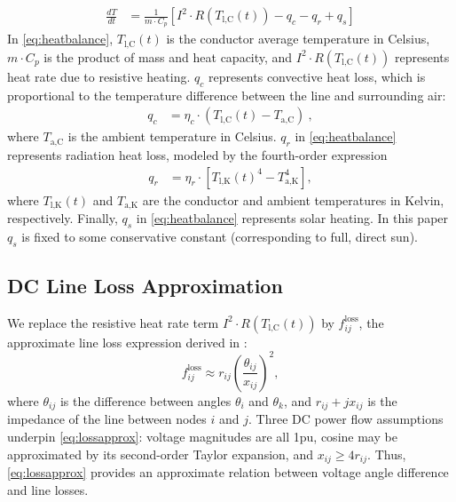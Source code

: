 \documentclass[journal,twoside]{IEEEtran}
\begin{document}
\begin{align}\label{eq:heatbalance}
\frac{dT}{dt} &= \frac{1}{m\cdot C_p}\left[I^2\cdot R(T_\text{l,C}(t)) - q_c - q_r + q_s \right]
\end{align}
In \eqref{eq:heatbalance}, $T_\text{l,C}(t)$ is the conductor average temperature in Celsius, $m\cdot C_p$ is the product of mass and heat capacity, and $I^2\cdot R(T_\text{l,C}(t))$ represents heat rate due to resistive heating. $q_c$ represents convective heat loss, which is proportional to the temperature difference between the line and surrounding air:
\begin{align}\label{eq:qc}
q_c &= \eta_c\cdot(T_\text{l,C}(t) - T_\text{a,C})~,
\end{align}
where $T_\text{a,C}$ is the ambient temperature in Celsius. $q_r$ in \eqref{eq:heatbalance} represents radiation heat loss, modeled by the fourth-order expression
\begin{align}\label{eq:qr}
 q_r &= \eta_r\cdot\left[T_\text{l,K}(t)^4 - T_\text{a,K}^4\right],
\end{align}
where $T_\text{l,K}(t)$ and $T_\text{a,K}$ are the conductor and ambient temperatures in Kelvin, respectively. Finally, $q_s$ in \eqref{eq:heatbalance} represents solar heating. In this paper $q_s$ is fixed to some conservative constant (corresponding to full, direct sun).

\subsection{DC Line Loss Approximation}
We replace the resistive heat rate term $I^2\cdot R(T_\text{l,C}(t))$ by $f_{ij}^\text{loss}$, the approximate line loss expression derived in \cite{almassalkhi2014}:
\begin{equation}\label{eq:lossapprox}
f_{ij}^{\text{loss}} \approx r_{ij}\left(\frac{\theta_{ij}}{x_{ij}}\right)^2,
\end{equation}
where $\theta_{ij}$ is the difference between angles $\theta_i$ and $\theta_k$, and $r_{ij} +j x_{ij}$ is the impedance of the line between nodes $i$ and $j$. Three DC power flow assumptions underpin \eqref{eq:lossapprox}: voltage magnitudes are all 1pu, cosine may be approximated by its second-order Taylor expansion, and $x_{ij} \geq 4r_{ij}$. Thus, \eqref{eq:lossapprox} provides an approximate relation between voltage angle difference and line losses.
\end{document}
